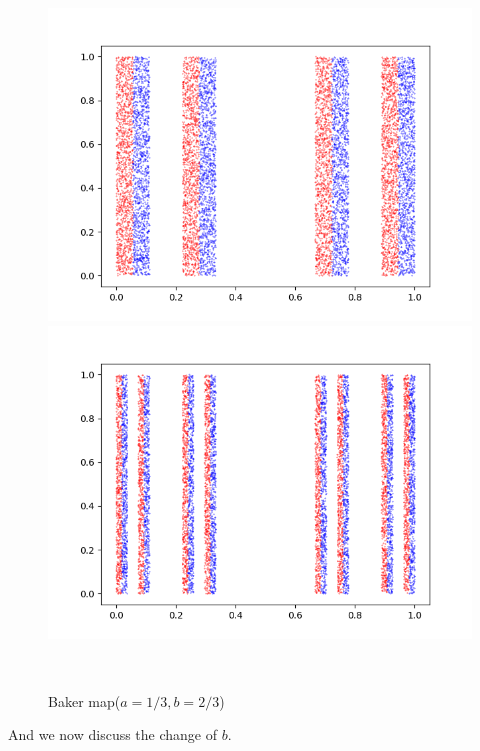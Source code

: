 \documentclass[12pt]{article}
\theoremstyle{plain}
\begin{document}
\begin{figure}[H]
\begin{minipage}[c][0.24\width]{
   0.24\textwidth}
   \centering
   \includegraphics[width=1\textwidth]{figure/section5/baker-2-0*33-0*67.png}
\end{minipage}
\begin{minipage}[c][0.24\width]{
   0.24\textwidth}
   \centering
   \includegraphics[width=1\textwidth]{figure/section5/baker-3-0*33-0*67.png}
\end{minipage}
\\[2ex]\caption{Baker map($a = 1/3, b = 2/3$)}
\end{figure}

And we now discuss the change of $b$. \\[2ex]
\end{document}
